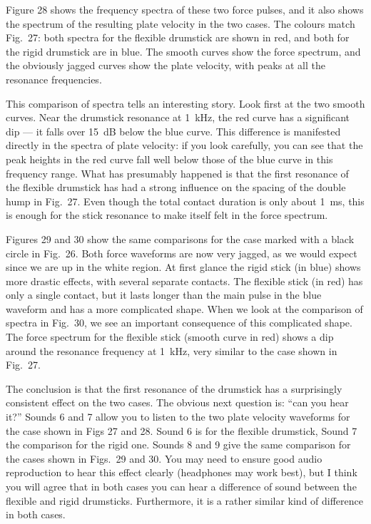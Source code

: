   Figure 28 shows the frequency spectra of these two force pulses, and it also 
  shows the spectrum of the resulting plate velocity in the two cases. The 
  colours match Fig.\ 27: both spectra for the flexible drumstick are shown in 
  red, and both for the rigid drumstick are in blue. The smooth curves show the 
  force spectrum, and the obviously jagged curves show the plate velocity, with 
  peaks at all the resonance frequencies. 

  This comparison of spectra tells an interesting story. Look first at the two 
  smooth curves. Near the drumstick resonance at 1~kHz, the red curve has a 
  significant dip — it falls over 15~dB below the blue curve. This difference 
  is manifested directly in the spectra of plate velocity: if you look 
  carefully, you can see that the peak heights in the red curve fall well below 
  those of the blue curve in this frequency range. What has presumably happened 
  is that the first resonance of the flexible drumstick has had a strong 
  influence on the spacing of the double hump in Fig.\ 27. Even though the 
  total contact duration is only about 1~ms, this is enough for the stick 
  resonance to make itself felt in the force spectrum. 

  Figures 29 and 30 show the same comparisons for the case marked with a black 
  circle in Fig.\ 26. Both force waveforms are now very jagged, as we would 
  expect since we are up in the white region. At first glance the rigid stick 
  (in blue) shows more drastic effects, with several separate contacts. The 
  flexible stick (in red) has only a single contact, but it lasts longer than 
  the main pulse in the blue waveform and has a more complicated shape. When we 
  look at the comparison of spectra in Fig.\ 30, we see an important 
  consequence of this complicated shape. The force spectrum for the flexible 
  stick (smooth curve in red) shows a dip around the resonance frequency at 
  1~kHz, very similar to the case shown in Fig.\ 27. 

  The conclusion is that the first resonance of the drumstick has a 
  surprisingly consistent effect on the two cases. The obvious next question 
  is: “can you hear it?” Sounds 6 and 7 allow you to listen to the two plate 
  velocity waveforms for the case shown in Figs 27 and 28. Sound 6 is for the 
  flexible drumstick, Sound 7 the comparison for the rigid one. Sounds 8 and 9 
  give the same comparison for the cases shown in Figs.\ 29 and 30. You may 
  need to ensure good audio reproduction to hear this effect clearly 
  (headphones may work best), but I think you will agree that in both cases you 
  can hear a difference of sound between the flexible and rigid drumsticks. 
  Furthermore, it is a rather similar kind of difference in both cases. 

